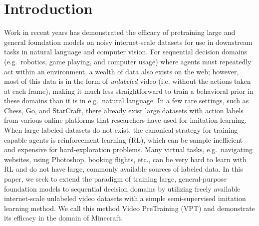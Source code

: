 \section{Introduction}

Work in recent years has demonstrated the efficacy of pretraining large and general foundation models \cite{bommasani2021opportunities} on noisy internet-scale datasets for use in downstream tasks in natural language \cite{devlin2018bert,liu2019roberta,raffel2019exploring,brown2020language} and computer vision. \cite{mahajan2018exploring, zhai2021scaling, radford2021learning}
For sequential decision domains (e.g.\ robotics, game playing, and computer usage) where agents must repeatedly act within an environment, a wealth of data also exists on the web; however, most of this data is in the form of \textit{unlabeled} video (i.e. without the actions taken at each frame), making it much less straightforward to train a behavioral prior in these domains than it is in e.g.\ natural language.
In a few rare settings, such as Chess, Go, and StarCraft, there already exist large datasets with action labels from various online platforms that researchers have used for imitation learning. \cite{silver2016mastering, vinyals2019grandmaster}
When large labeled datasets do not exist, the canonical strategy for training capable agents is reinforcement learning (RL),\cite{sutton2018reinforcement} which can be sample inefficient and expensive for hard-exploration problems.\cite{berner2019dota, baker2019emergent, jaderberg2019human, badia2020agent57, bellemare2016unifying, burda2018exploration, ecoffet2021first}
Many virtual tasks, e.g.\ navigating websites, using Photoshop, booking flights, etc., can be very hard to learn with RL and do not have large, commonly available sources of labeled data.\cite{humphreys2022data,pmlrv70shi17a}
In this paper, we seek to extend the paradigm of training large, general-purpose foundation models to sequential decision domains by utilizing freely available internet-scale unlabeled video datasets with a simple semi-supervised imitation learning method. We call this method Video PreTraining (VPT) and demonstrate its efficacy in the domain of Minecraft.

